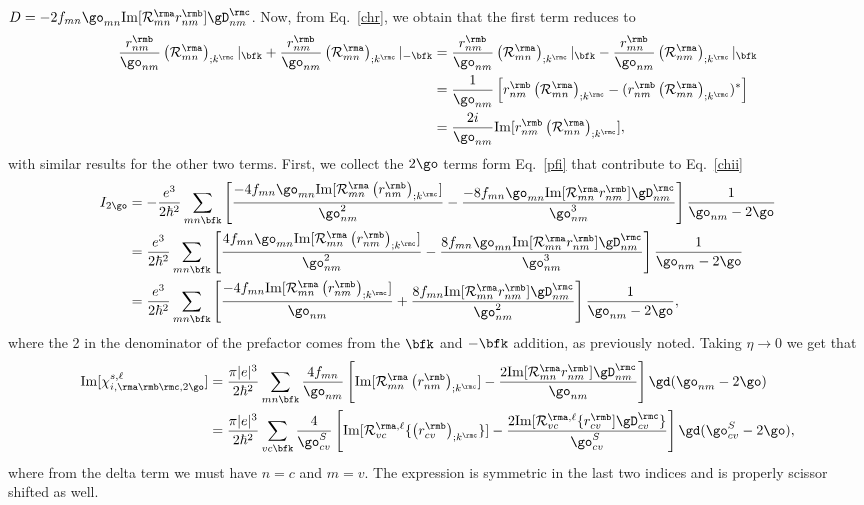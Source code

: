 $D=-2f_{mn}\go_{mn}\mathrm{Im}[{\cal  R}^{\rma}_{mn}r^{\rmb}_{nm}]\gD^{\rmc}_{nm}$.
 Now, from Eq.~\eqref{chr}, we obtain
that the first term reduces to
\begin{align}\label{chrn2}
\frac{r^{\rmb}_{nm}}{\go_{nm}}\left({\cal R}^{\rma}_{mn}\right)_{;k^{\rmc}}|_{\bfk}
+
\frac{r^{\rmb}_{nm}}{\go_{nm}}\left({\cal R}^{\rma}_{mn}\right)_{;k^{\rmc}}|_{-\bfk}
&=
\frac{r^{\rmb}_{nm}}{\go_{nm}}\left({\cal R}^{\rma}_{mn}\right)_{;k^{\rmc}}|_{\bfk}
-
\frac{r^{\rmb}_{mn}}{\go_{nm}}\left({\cal R}^{\rma}_{nm}\right)_{;k^{\rmc}}|_{\bfk}
\nonumber\\
&=
\frac{1}{\go_{nm}}\left[r^{\rmb}_{nm}\left({\cal R}^{\rma}_{mn}\right)_{;k^{\rmc}}
-
(r^{\rmb}_{nm}\left({\cal R}^{\rma}_{mn}\right)_{;k^{\rmc}})^*\right]
\nonumber\\
&=
\frac{2i}{\go_{nm}}\mathrm{Im}[r^{\rmb}_{nm}\left({\cal R}^{\rma}_{mn}\right)_{;k^{\rmc}}]
,
\end{align}
with similar results for the other two terms. First, we collect the
$2\go$ terms form Eq.~\eqref{pfi} that contribute to Eq.~\eqref{chii}
\begin{align}\label{2wchii}
I_{2\go}&=
-\frac{e^3}{2\hbar^2}\sum_{mn\bfk}
\left[
\frac{-4f_{mn}\go_{mn}\mathrm{Im}[{\cal R}^{\rma}_{mn}\left(r^{\rmb}_{nm}\right)_{;k^{\rmc}}]}{\go^2_{nm}}
-
\frac{-8f_{mn}\go_{mn}\mathrm{Im}[{\cal R}^{\rma}_{mn}r^{\rmb}_{nm}]\gD^{\rmc}_{nm}}{\go^3_{nm}}
\right]\frac{1}{\go_{nm}-2\go}
\nonumber\\
&=
\frac{e^3}{2\hbar^2}\sum_{mn\bfk}
\left[
\frac{4f_{mn}\go_{mn}\mathrm{Im}[{\cal R}^{\rma}_{mn}\left(r^{\rmb}_{nm}\right)_{;k^{\rmc}}]}{\go^2_{nm}}
-
\frac{8f_{mn}\go_{mn}\mathrm{Im}[{\cal R}^{\rma}_{mn}r^{\rmb}_{nm}]\gD^{\rmc}_{nm}}{\go^3_{nm}}
\right]\frac{1}{\go_{nm}-2\go}
\nonumber\\
&=
\frac{e^3}{2\hbar^2}\sum_{mn\bfk}
\left[
\frac{-4f_{mn}\mathrm{Im}[{\cal R}^{\rma}_{mn}\left(r^{\rmb}_{nm}\right)_{;k^{\rmc}}]}{\go_{nm}}
+
\frac{8f_{mn}\mathrm{Im}[{\cal R}^{\rma}_{mn}r^{\rmb}_{nm}]\gD^{\rmc}_{nm}}{\go^2_{nm}}
\right]\frac{1}{\go_{nm}-2\go}
,
\end{align}
where the 2 in the denominator of the prefactor
comes from the $\bfk$ and $-\bfk$ addition, as previously noted.
Taking $\eta\to 0$ we get that
\begin{align}\label{imchi2w}
\mathrm{Im}[\chi_{i,\rma\rmb\rmc,2\go}^{s,\ell}]
&=
\frac{\pi|e|^3}{2\hbar^2}\sum_{mn\bfk}
\frac{4f_{mn}}{\go_{nm}}
\left[
\mathrm{Im}[{\cal R}^{\rma}_{mn}\left(r^{\rmb}_{nm}\right)_{;k^{\rmc}}]
-
\frac{2\mathrm{Im}[{\cal R}^{\rma}_{mn}r^{\rmb}_{nm}]\gD^{\rmc}_{nm}}{\go_{nm}}
\right]\gd(\go_{nm}-2\go)
\nonumber \\
&=
\frac{\pi|e|^3}{2\hbar^2}\sum_{vc\bfk}
\frac{4}{\go^S_{cv}}
\left[
\mathrm{Im}[{\cal R}^{\rma,\ell}_{vc}\{\left(r^{\rmb}_{cv}\right)_{;k^{\rmc}}\}]
-
\frac{2\mathrm{Im}[{\cal R}^{\rma,\ell}_{vc}\{r^{\rmb}_{cv}]\gD^{\rmc}_{cv}\}}{\go^S_{cv}}
\right]\gd(\go^S_{cv}-2\go)
,
\end{align} 
where from the delta term we must have $n=c$ and $m=v$. The expression
is symmetric in the last two indices and is properly scissor shifted
as well. 

